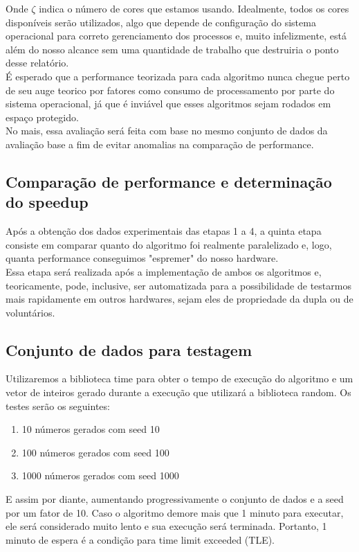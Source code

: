 \documentclass{article}
\begin{document}
Onde $\zeta$ indica o número de cores que estamos usando. Idealmente, todos os cores disponíveis serão utilizados, algo que depende de configuração do sistema operacional para correto gerenciamento dos processos e, muito infelizmente, está além do nosso alcance sem uma quantidade de trabalho que destruiria o ponto desse relatório.\\
É esperado que a performance teorizada para cada algoritmo nunca chegue perto de seu auge teorico por fatores como consumo de processamento por parte do sistema operacional, já que é inviável que esses algoritmos sejam rodados em espaço protegido.\\
No mais, essa avaliação será feita com base no mesmo conjunto de dados da avaliação base a fim de evitar anomalias na comparação de performance.\\


\subsection{Comparação de performance e determinação do speedup}
Após a obtenção dos dados experimentais das etapas 1 a 4, a quinta etapa consiste em comparar quanto do algoritmo foi realmente paralelizado e, logo, quanta performance conseguimos "espremer" do nosso hardware.\\
Essa etapa será realizada após a implementação de ambos os algoritmos e, teoricamente, pode, inclusive, ser automatizada para a possibilidade de testarmos mais rapidamente em outros hardwares, sejam eles de propriedade da dupla ou de voluntários.\\

\subsection{Conjunto de dados para testagem}
Utilizaremos a biblioteca time para obter o tempo de execução do algoritmo e um vetor de inteiros gerado durante a execução que utilizará a biblioteca random. Os testes serão os seguintes:
    \begin{enumerate}
        \item 10 números gerados com seed 10
        \item 100 números gerados com seed 100
        \item 1000 números gerados com seed 1000
    \end{enumerate}
E assim por diante, aumentando progressivamente o conjunto de dados e a seed por um fator de 10. Caso o algoritmo demore mais que 1 minuto para executar, ele será considerado muito lento e sua execução será terminada. Portanto, 1 minuto de espera é a condição para time limit exceeded (TLE).
\end{document}

